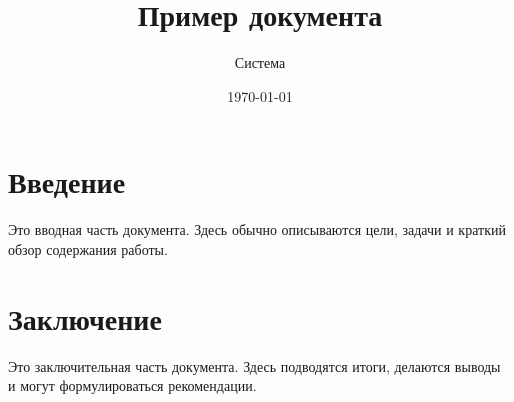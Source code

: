\documentclass{article}
\title{Пример документа}
\author{Система}
\date{\today}
\begin{document}
\maketitle

\section{Введение}
Это вводная часть документа. Здесь обычно описываются цели, задачи и краткий обзор содержания работы.

\section{Заключение}
Это заключительная часть документа. Здесь подводятся итоги, делаются выводы и могут формулироваться рекомендации.
\end{document}
